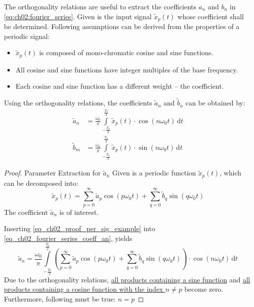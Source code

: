 \begin{refsection}
The orthogonality relations are useful to extract the coefficients $a_n$ and $b_n$ in \eqref{eq:ch02:fourier_series}. Given is the input signal $\tilde{x}_p(t)$ whose coefficient shall be determined. Following assumptions can be derived from the properties of a periodic signal:
\begin{itemize}
	\item $\tilde{x}_p(t)$ is composed of mono-chromatic cosine and sine functions.
	\item All cosine and sine functions have integer multiples of the base frequency.
	\item Each cosine and sine function has a different weight -- the coefficient.
\end{itemize}

Using the orthogonality relations, the coefficients $\tilde{a}_n$ and $\tilde{b}_n$ can be obtained by:
\begin{subequations}
	\begin{align}
		\tilde{a}_n &= \frac{\omega_0}{\pi} \int\limits_{-\frac{T_0}{2}}^{\frac{T_0}{2}} \tilde{x}_p(t) \cdot \cos\left(n \omega_0 t\right) \, \mathrm{d} t \label{eq_ch02_fourier_series_coeff_an} \\
		\tilde{b}_m &= \frac{\omega_0}{\pi} \int\limits_{-\frac{T_0}{2}}^{\frac{T_0}{2}} \tilde{x}_p(t) \cdot \sin\left(n \omega_0 t\right) \, \mathrm{d} t \label{eq_ch02_fourier_series_coeff_bm}
	\end{align}
\end{subequations}

\begin{proof}{Parameter Extraction for $\tilde{a}_n$}
	Given is a periodic function $\tilde{x}_p(t)$, which can be decomposed into:
	\begin{equation}
		\tilde{x}_p(t) = \sum\limits_{p=0}^{\infty} \tilde{a}_p \cos\left(p \omega_0 t\right) + \sum\limits_{q=0}^{\infty} \tilde{b}_q \sin\left(q \omega_0 t\right)
		\label{eq_ch02_proof_per_sig_example}
	\end{equation}
	The coefficient $\tilde{a}_n$ is of interest.
	
	Inserting \eqref{eq_ch02_proof_per_sig_example} into \eqref{eq_ch02_fourier_series_coeff_an}, yields
	\begin{equation}
		\tilde{a}_n = \frac{\omega_0}{\pi} \int\limits_{-\frac{T_0}{2}}^{\frac{T_0}{2}} \left(\sum\limits_{p=0}^{\infty} \tilde{a}_p \cos\left(p \omega_0 t\right) + \sum\limits_{q=0}^{\infty} \tilde{b}_q \sin\left(q \omega_0 t\right)\right) \cdot \cos\left(n \omega_0 t\right) \, \mathrm{d} t
	\end{equation}
	Due to the orthogonality relations, \underline{all products containing a sine function} and \underline{all products containing a cosine function with the index $n \neq p$} become zero. Furthermore, following must be true: $n = p$
	

\end{proof}
\end{refsection}
